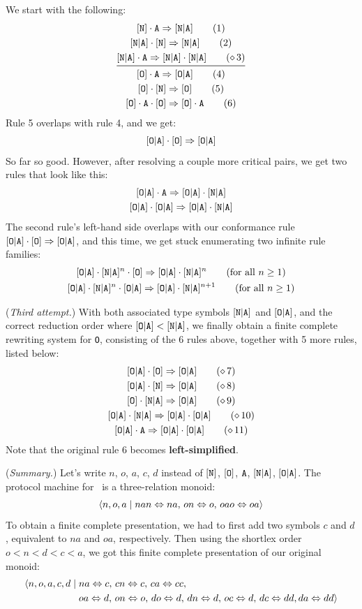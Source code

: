 \documentclass[../generics]{subfiles}
\begin{document}
\begin{example}
We start with the following:
\begin{gather*}
\AssocIntro{N}{A}\tag{1}\\
\ProtoConf{\aNA}{N}\tag{2}\\
\aNA\cdot\nA\Red\aNA\cdot\aNA\tag{$\CRule{3}$}\\
\midrule
\AssocIntro{O}{A}\tag{4}\\
\ProtoConf{\pO}{N}\tag{5}\\
\ProtoConf{\pO\cdot\nA}{O}\tag{6}
\end{gather*}
Rule 5 overlaps with rule 4, and we get:
\[
[\texttt{O}|\texttt{A}]\cdot[\texttt{O}]\Rightarrow [\texttt{O}|\texttt{A}]
\]
So far so good. However, after resolving a couple more critical pairs, we get two rules that look like this:
\begin{gather*}
\aOA \cdot \nA \Red \aOA \cdot \aNA \\
\aOA \cdot \aOA \Red \aOA \cdot \aNA
\end{gather*}
The second rule's left-hand side overlaps with our conformance rule $[\texttt{O}|\texttt{A}]\cdot[\texttt{O}]\Rightarrow [\texttt{O}|\texttt{A}]$, and this time, we get stuck enumerating two infinite rule families:
\begin{gather*}
\ProtoConf{\aOA\cdot\aNA^n}{O} \tag{for all $n \geq 1$}\\
\aOA\cdot\aNA^n\cdot\aOA \Red \aOA\cdot\aNA^{n+1} \tag{for all $n \geq 1$}
\end{gather*}

\smallskip

(\emph{Third attempt.}) With both associated type symbols $[\texttt{N}|\texttt{A}]$ and $[\texttt{O}|\texttt{A}]$, and the correct reduction order where $[\texttt{O}|\texttt{A}] < [\texttt{N}|\texttt{A}]$, we finally obtain a finite complete rewriting system for \texttt{O}, consisting of the 6 rules above, together with 5 more rules, listed below:
\begin{gather*}
\ProtoConf{\aOA}{O} \tag{$\CRule{7}$}\\
\ProtoConf{\aOA}{N} \tag{$\CRule{8}$}\\
\pO\cdot\aNA \Red \aOA \tag{$\CRule{9}$}\\
\aOA\cdot\aNA \Red \aOA \cdot \aOA \tag{$\CRule{10}$}\\
\aOA\cdot\nA \Red \aOA \cdot \aOA \tag{$\CRule{11}$}
\end{gather*}
Note that the original rule 6 becomes \textbf{left-simplified}.

(\emph{Summary.}) Let's write $n$, $o$, $a$, $c$, $d$ instead of $[\texttt{N}]$, $[\texttt{O}]$, $\texttt{A}$, $[\texttt{N}|\texttt{A}]$, $[\texttt{O}|\texttt{A}]$. The protocol machine for \tO\ is a three-relation monoid:
\[
\langle n, o, a \mid nan \Leftrightarrow na,\, on \Leftrightarrow o,\, oao \Leftrightarrow oa\rangle
\]
To obtain a finite complete presentation, we had to first add two symbols $c$ and $d$, equivalent to $na$ and $oa$, respectively. Then using the shortlex order $o < n < d < c < a$, we got this finite complete presentation of our original monoid:
\begin{align*}
\langle n, o, a, c, d \mid {}&na \Leftrightarrow c,\, cn \Leftrightarrow c,\, ca \Leftrightarrow cc,\, \\
&oa \Leftrightarrow d,\, on \Leftrightarrow o,\, do \Leftrightarrow d,\, dn \Leftrightarrow d,\, oc \Leftrightarrow d,\, dc \Leftrightarrow dd, da \Leftrightarrow dd\rangle
\end{align*}


\end{example}
\end{document}
